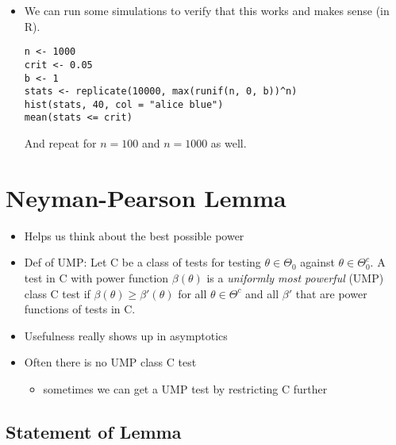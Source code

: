 \begin{itemize}
\begin{ex}
    Now, to find $c$ so that $\sup_{b ≥ 1} \Pr_b[(\max_i X_i)ⁿ ≤ c] = α$
    \begin{align*}
      \sup_{b ≥ 1} \Pr_b[(\max_i X_i)ⁿ ≤ c]
      &= \sup_{b≥ 1} \Pr_b[\max_i X_i/b ≤ c^{1/n}/b] \\
      &= \sup_{b ≥ 1} \Pr_b[X₁/b ≤ c^{1/n}/b, ..., X_n/b ≤ c^{1/n}/b] \\
      &= \sup_{b ≥ 1} \Pr_b[X₁/b ≤ c^{1/n}/b] ⋯ \Pr_b[X_n/b ≤ c^{1/n}/b] \\
      &= \sup_{b ≥ 1} c/bⁿ \\
      &= c
    \end{align*}
    where we're using the fact that $X_i/b ∼ \uniform(0,1)$.  So
    $c=α$.  This test is obviously equivalent to comparing $\max_i
    X_i$ to $α^{1/n}$.
  \end{ex}

\item We can run some simulations to verify that this works and makes
  sense (in R).
\begin{verbatim}
n <- 1000
crit <- 0.05
b <- 1
stats <- replicate(10000, max(runif(n, 0, b))^n)
hist(stats, 40, col = "alice blue")
mean(stats <= crit)
\end{verbatim}
  And repeat for $n = 100$ and $n = 1000$ as well.
\end{itemize}

\section{Neyman-Pearson Lemma}

\begin{itemize}
\item Helps us think about the best possible power
\item Def of UMP: Let C be a class of tests for testing $θ ∈ Θ_0$
  against $θ ∈ Θ_0^c$.  A test in C with power function $β(θ)$ is a
  \emph{uniformly most powerful} (UMP) class C test if $β(θ) ≥ β'(θ)$
  for all $θ ∈ Θ^c$ and all $β'$ that are power functions of tests in
  C.
\item Usefulness really shows up in asymptotics
\item Often there is no UMP class C test
\begin{itemize}
\item sometimes we can get a UMP test by restricting C further
\end{itemize}
\end{itemize}

\subsection{Statement of Lemma}

